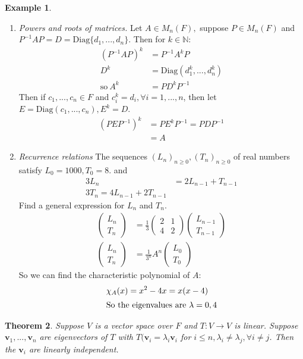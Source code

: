 \documentclass{report}
\newtheorem{theorem}{Theorem}[subsection]
\theoremstyle{remark}
\theoremstyle{definition}
\theoremstyle{definition}
\newtheorem{example}[theorem]{Example}
\theoremstyle{theorem}
\renewcommand{\v}[1]{\mathbf{#1}}
\providecommand{\vectii}[2]{\begin{pmatrix}#1\\#2\end{pmatrix}}
\begin{document}
\begin{example}
\begin{enumerate}[label=\textcircled{\small{\arabic*}}]
    \item \emph{Powers and roots of matrices.} Let $A \in M_n(F),$ suppose $P \in M_n(F)$ and $P^{-1}AP=D=\mathrm{Diag}\{d_1,...,d_n\}$. Then for $k \in \mathbb{N}$:
    \begin{align*}
        (P^{-1}AP)^k&=P^{-1}A^kP\\
        D^k&=\mathrm{Diag}(d_1^k,...,d_n^k)\\
        \text{so} \> A^k&=PD^kP^{-1}
    \end{align*}
    Then if $c_1,...,c_n \in F$ and $c_i^k=d_i, \forall i=1,...,n$, then let $E=\mathrm{Diag}(c_1,...,c_n), E^k=D$.
    \begin{align*}
        (PEP^{-1})^k&=PE^k{}P^{-1}=PDP^{-1}\\
        &=A
    \end{align*}
    \item \emph{Recurrence relations}
    The sequences $(L_n)_{n\geq0},(T_n)_{n\geq0}$ of real numbers satisfy $L_0=1000, T_0=8$. and
    \begin{align*}
        3L_n&=2L_{n-1}+T_{n-1}\\
        3T_n=4L_{n-1}+2T_{n-1}
    \end{align*}
    Find a general expression for $L_n$ and $T_n$.
    \begin{align*}
        \vectii{L_n}{T_n}&=\frac{1}{3}\begin{pmatrix}
        2&1\\4&2
        \end{pmatrix}\vectii{L_{n-1}}{T_{n-1}}\\
        \vectii{L_n}{T_n}&= \frac{1}{3^n}A^n\vectii{L_0}{T_0}
    \end{align*}
    So we can find the characteristic polynomial of $A:$
    \begin{align*}
        \chi_A(x)&=x^2-4x=x(x-4)\\
        \intertext{So the eigenvalues are $\lambda=0,4$}
    \end{align*}
\end{enumerate}
\end{example}
\begin{theorem}
Suppose $V$ is a vector space over $F$ and $T:V\rightarrow V$ is linear. Suppose $\v{v}_1,...,\v{v}_n$ are eigenvectors of $T$ with $T(\v{v}_i=\lambda_i\v{v}_i$ for $i\leq n, \lambda_i\neq \lambda_j, \forall i\neq j$. Then the $\v{v}_i$ are linearly independent.
\end{theorem}
\end{document}
